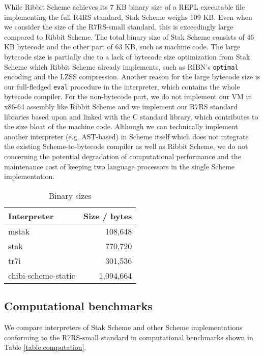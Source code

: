 \documentclass[sigplan]{acmart}
\begin{document}
While Ribbit Scheme \cite{ribbit7kb2023} achieves its 7 KB binary size
of a REPL executable file implementing the full R4RS standard, Stak
Scheme weighs 109 KB.
Even when we consider the size of the R7RS-small standard, this is
exceedingly large compared to Ribbit Scheme.
The total binary size of Stak Scheme consists of 46 KB bytecode and
the other part of 63 KB, such as machine code.
The large bytecode size is partially due to a lack of
bytecode size optimization from Stak Scheme which Ribbit Scheme already
implements, such as RIBN's \texttt{optimal} encoding and the
LZSS compression.
Another reason for the large bytecode size is our full-fledged
\texttt{eval} procedure in the interpreter, which contains the
whole bytecode compiler.
For the non-bytecode part, we do not implement our VM in x86-64
assembly like Ribbit Scheme and we implement our R7RS standard libraries
based upon and linked with the C standard library,
which contributes to the size bloat of the machine code.
Although we can technically implement another interpreter
(e.g. AST-based) in Scheme itself which does not integrate the
existing Scheme-to-bytecode compiler as well as Ribbit Scheme,
we do not concerning the potential degradation of
computational performance and the maintenance cost of keeping two
language processors in the single Scheme implementation.

\begin{table}
  \begin{center}
    \begin{tabular}{l|r}
      \hline
      Interpreter & Size / bytes \\
      \hline
      mstak & 108,648 \\
      stak & 770,720 \\
      tr7i & 301,536 \\
      chibi-scheme-static & 1,094,664 \\
      \hline
    \end{tabular}

    \caption{Binary sizes}
    \label{table:binary}
  \end{center}
\end{table}

\subsection{Computational benchmarks}

We compare interpreters of Stak Scheme and other Scheme
implementations conforming to the R7RS-small standard in computational
benchmarks shown in Table \ref{table:computation}.
\end{document}
